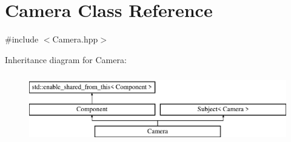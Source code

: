 \hypertarget{class_camera}{}\section{Camera Class Reference}
\label{class_camera}


{\ttfamily \#include $<$Camera.\+hpp$>$}

Inheritance diagram for Camera\+:\begin{figure}[H]
\begin{center}
\leavevmode
\includegraphics[height=3.000000cm]{class_camera}
\end{center}
\end{figure}
